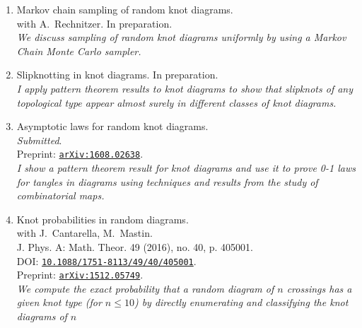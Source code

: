 \documentclass[letterpaper]{article}
\begin{document}
\begin{enumerate}
\item Markov chain sampling of random knot diagrams. \\
  with A.\ Rechnitzer. In preparation.\\
  \textit{We discuss sampling of random knot diagrams uniformly by
    using a Markov Chain Monte Carlo sampler.}
\item Slipknotting in knot diagrams.
  In preparation.\\
  \textit{I apply pattern theorem results to knot diagrams to show
    that slipknots of any topological type appear almost surely in
    different classes of knot diagrams.}
\item Asymptotic laws for random knot diagrams. \\
  \emph{Submitted}. \\
  Preprint: \href{http://arxiv.org/abs/1608.02638}{\tt arXiv:1608.02638}.\\
  \textit{I show a pattern theorem result for knot diagrams and use it
    to prove 0-1 laws for tangles in diagrams using techniques and
    results from the study of combinatorial maps.}
\item Knot probabilities in random diagrams.\\
  with J.\ Cantarella, M.\ Mastin. \\
  J. Phys. A: Math. Theor. 49 (2016), no. 40, p. 405001.\\
  DOI: \href{http://dx.doi.org/10.1088/1751-8113/49/40/405001}{\tt 10.1088/1751-8113/49/40/405001}.\\
  Preprint: \href{http://arxiv.org/abs/1512.05749}{\tt arXiv:1512.05749}.\\
  \textit{We compute the exact probability that a random diagram of
    $n$ crossings has a given knot type (for $n \leq 10$) by directly
    enumerating and classifying the knot diagrams of $n$
}
\end{enumerate}
\end{document}
